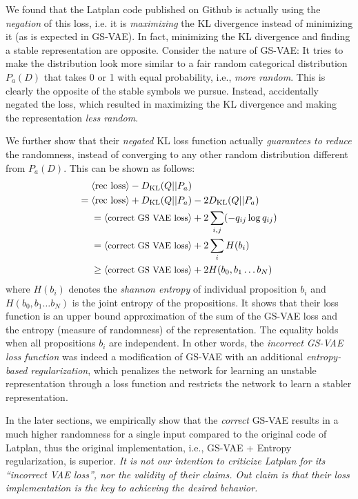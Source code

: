 We found that the Latplan code published on Github is actually using the \emph{negation} of this loss,
i.e. it is \emph{maximizing} the KL divergence instead of minimizing it (as is expected in GS-VAE).
In fact, minimizing the KL divergence and finding a stable representation are opposite.
Consider the nature of GS-VAE:
It tries to make the distribution look more similar to a fair random categorical distribution $P_a(D)$
that takes 0 or 1 with equal probability, i.e., \emph{more random}.
This is clearly the opposite of the stable symbols we pursue.
Instead, \citeauthor{Asai2018} accidentally negated the loss, which resulted in
maximizing the KL divergence and making the representation \emph{less random}.

We further show that their \emph{negated} KL loss function
actually \emph{guarantees to reduce} the randomness,
instead of converging to any other random distribution different from $P_a(D)$.
This can be shown as follows:
\begin{align*} 
 \brackets{\text{rec loss}}-D_{\text{KL}}(Q||P_a) &                                   \\
=\brackets{\text{rec loss}}+D_{\text{KL}}(Q||P_a) &- 2 D_{\text{KL}}(Q||P_a)          \\
=\brackets{\text{\small correct GS VAE loss}}     & + 2 \sum_{i,j} (- q_{ij} \log q_{ij}) \\
=\brackets{\text{\small correct GS VAE loss}}     & + 2 \sum_{i} H(b_i)                   \\
\geq\brackets{\text{\small correct GS VAE loss}}  & + 2 H(b_0,b_1\ldots b_N)
\end{align*}
where $H(b_i)$ denotes the \emph{shannon entropy} of individual proposition $b_i$ and
$H(b_0,b_1\ldots b_N)$ is the joint entropy of the propositions.
It shows that their loss function is an upper bound approximation of
the sum of the GS-VAE loss and the entropy (measure of randomness) of the representation.
The equality holds when all propositions $b_i$ are independent.
% 
In other words,
the \emph{incorrect GS-VAE loss function}
was indeed a modification of GS-VAE with an additional \emph{entropy-based regularization},
which penalizes the network for learning an unstable representation
through a loss function and restricts the network to learn a stabler representation.

In the later sections, we empirically show that the \emph{correct} GS-VAE results in
a much higher randomness for a single input compared to the original code of Latplan,
thus the original implementation, i.e., GS-VAE + Entropy regularization, is superior.
% 
\emph{It is not our intention to criticize Latplan for its ``incorrect VAE loss'',
nor the validity of their claims.
Out claim is that their loss implementation is the key to achieving the desired behavior.}

